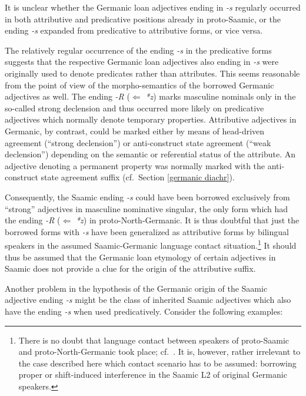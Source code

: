 {\noindent It is unclear whether the Germanic loan adjectives ending in \textit{-s} regularly occurred in both attributive and predicative positions already in proto-Saamic, or the ending \textit{-s} expanded from predicative to attributive forms, or vice versa.

The relatively regular occurrence of the ending \textit{-s} in the predicative forms suggests that the respective Germanic loan adjectives also ending in \textit{-s} were originally used to denote predicates rather than attributes. This seems reasonable from the point of view of the morpho-semantics of the borrowed Germanic adjectives as well. The ending \textit{-R} ($\Leftarrow$ \textit{*z}) marks masculine nominals only in the so-called strong declension and thus occurred more likely on predicative adjectives which normally denote temporary properties. Attributive adjectives in Germanic, by contrast, could be marked either by means of head-driven agreement (“strong declension”) or anti-construct state agreement (“weak declension”) depending on the semantic or referential status of the attribute. An adjective denoting a permanent property was normally marked with the anti-construct state agreement suffix (cf.~Section \ref{germanic diachr}).

Consequently, the Saamic ending \textit{-s} could have been borrowed exclusively from “strong” adjectives in masculine nominative singular, the only form which had the ending \textit{-R} ($\Leftarrow$ \textit{*z}) in proto-North-Germanic. It is thus doubtful that just the borrowed forms with \textit{-s} have been generalized as attributive forms by bilingual speakers in the assumed Saamic-Germanic language contact situation.\footnote{There is no doubt that language contact between speakers of proto-Saamic and proto-North-Germanic took place; cf.~\citealt{kusmenko2008}. It is, however, rather irrelevant to the case described here which contact scenario has to be assumed: borrowing proper or shift-induced interference in the Saamic L2 of original Germanic speakers.} It should thus be assumed that the Germanic loan etymology of certain adjectives in Saamic does not provide a clue for the origin of the attributive suffix. 

Another problem in the hypothesis of the Germanic origin of the Saamic adjective ending \textit{-s} might be the class of inherited Saamic adjectives which also have the ending \textit{-s} when used predicatively. Consider the following examples:

}
